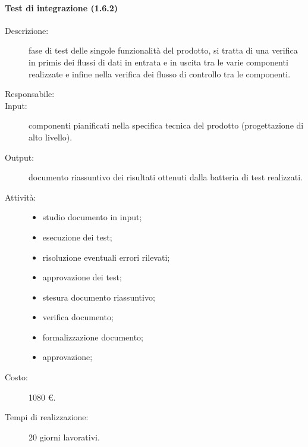 \paragraph{Test di integrazione (1.6.2)}
\begin{description}
\item[Descrizione:] fase di test delle singole funzionalità del prodotto, si tratta di una verifica in primis dei flussi di dati in entrata e in uscita tra le varie componenti realizzate e infine nella verifica dei flusso di controllo tra le componenti.
\item[Responsabile:] 
\item[Input:] componenti pianificati nella specifica tecnica del prodotto (progettazione di alto livello).
\item[Output:] documento riassuntivo dei risultati ottenuti dalla batteria di test realizzati.
\item[Attività:] 
\begin{center}
\begin{itemize}
\item studio documento in input;
\item esecuzione dei test;
\item risoluzione eventuali errori rilevati;
\item approvazione dei test;
\item stesura documento riassuntivo;
\item verifica documento;
\item formalizzazione documento;
\item approvazione;
\end{itemize}
\end{center}
\item[Costo:] 1080 \euro{}.
\item[Tempi di realizzazione:] 20 giorni lavorativi.
\end{description}


